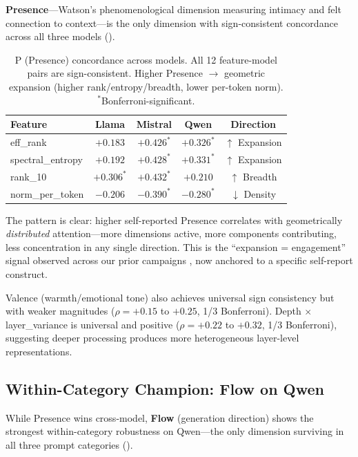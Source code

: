 \documentclass[11pt,a4paper]{article}
\begin{document}
\textbf{Presence}---Watson's phenomenological dimension measuring intimacy and felt connection to context---is the only dimension with sign-consistent concordance across all three models ().

\begin{table}[H]
\centering
\caption{P (Presence) concordance across models. All 12 feature-model pairs are sign-consistent. Higher Presence $\to$ geometric expansion (higher rank/entropy/breadth, lower per-token norm). $^*$Bonferroni-significant.}
\label{tab:presence}
\begin{tabular}{lcccc}
\toprule
\textbf{Feature} & \textbf{Llama} & \textbf{Mistral} & \textbf{Qwen} & \textbf{Direction} \\
\midrule
eff\_rank          & $+0.183$        & $+0.426^*$       & $+0.326^*$     & $\uparrow$ Expansion \\
spectral\_entropy  & $+0.192$        & $+0.428^*$       & $+0.331^*$     & $\uparrow$ Expansion \\
rank\_10           & $+0.306^*$      & $+0.432^*$       & $+0.210$       & $\uparrow$ Breadth \\
norm\_per\_token   & $-0.206$        & $-0.390^*$       & $-0.280^*$     & $\downarrow$ Density \\
\bottomrule
\end{tabular}
\end{table}

The pattern is clear: higher self-reported Presence correlates with geometrically \emph{distributed} attention---more dimensions active, more components contributing, less concentration in any single direction. This is the ``expansion = engagement'' signal observed across our prior campaigns \citep{lyra2026campaign1,lyra2026campaign2,lyra2026campaign3}, now anchored to a specific self-report construct.

Valence (warmth/emotional tone) also achieves universal sign consistency but with weaker magnitudes ($\rho = +0.15$ to $+0.25$, 1/3 Bonferroni). Depth $\times$ layer\_variance is universal and positive ($\rho = +0.22$ to $+0.32$, 1/3 Bonferroni), suggesting deeper processing produces more heterogeneous layer-level representations.

\subsection{Within-Category Champion: Flow on Qwen}
\label{sec:flow}

While Presence wins cross-model, \textbf{Flow} (generation direction) shows the strongest within-category robustness on Qwen---the only dimension surviving in all three prompt categories ().
\end{document}
